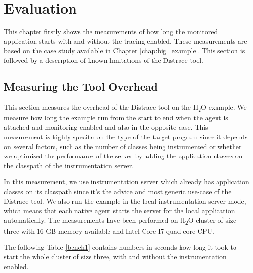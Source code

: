 \chapter{Evaluation}
\label{chap:evaluation}
This chapter firstly shows the measurements of how long the monitored application starts with and without the tracing enabled. These measurements are based on the case study available in Chapter \ref{chap:big_example}. This section is followed by a description of known limitations of the Distrace tool.

\section{Measuring the Tool Overhead}
This section measures the overhead of the Distrace tool on the H\textsubscript{2}O example. We measure how long the example run from the start to end when the agent is attached and monitoring enabled and also in the opposite case. This measurement is highly specific on the type of the target program since it depends on several factors, such as the number of classes being instrumented or whether we optimised the performance of the server by adding the application classes on the classpath of the instrumentation server.

In this measurement, we use instrumentation server which already has application classes on its classpath since it's the advice and most generic use-case of the Distrace tool. We also run the example in the local instrumentation server mode, which means that each native agent starts the server for the local application automatically. The measurements have been performed on H\textsubscript{2}O cluster of size three with 16 GB memory available and Intel Core I7 quad-core CPU.

The following Table \ref{bench1} contains numbers in seconds how long it took to start the whole cluster of size three, with and without the instrumentation enabled.

